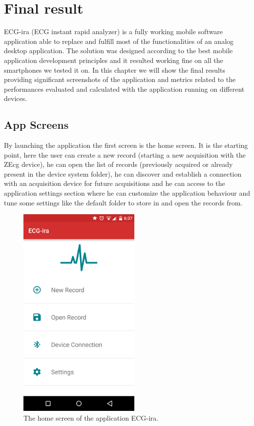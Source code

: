 \chapter{Final result}
ECG-ira (ECG instant rapid analyzer) is a fully working mobile software application able to replace and fulfill most of the functionalities of an analog desktop application. The solution was designed according to the best mobile application development principles and it resulted working fine on all the smartphones\cite{ref27} we tested it on. In this chapter we will show the final results providing significant screenshots of the application and metrics related to the performances evaluated and calculated with the application running on different devices.
\section{App Screens}
By launching the application the first screen is the home screen. It is the starting point, here the user can create a new record (starting a new acquisition with the ZEcg device), he can open the list of records (previously acquired or already present in the device system folder), he can discover and establish  a connection with an acquisition device for future acquisitions and he can access to the application settings section where he can customize the application behaviour and tune some settings like the default folder to store in and open the records from.
\begin{figure}[ht!]
	\centering
	\includegraphics[width=60mm]{figures/ch10/1.png}
	\caption{The home screen of the application ECG-ira.}
	\label{fig10.1}
\end{figure}
